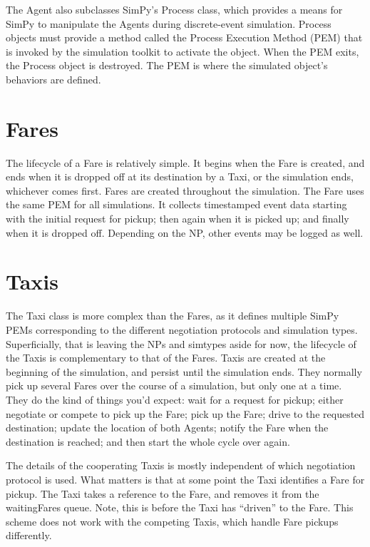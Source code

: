 \documentclass[11pt,letterpaper,onecolumn,twoside,openright,draft]{report}
\begin{document}
The Agent also subclasses SimPy's Process class, which provides a means for SimPy to manipulate the Agents during discrete-event simulation.
Process objects must provide a method called the Process Execution Method (PEM) that is invoked by the simulation toolkit to activate the object.
When the PEM exits, the Process object is destroyed.
The PEM is where the simulated object's behaviors are defined.

\section{Fares}
The lifecycle of a Fare is relatively simple.
It begins when the Fare is created, and ends when it is dropped off at its destination by a Taxi, or the simulation ends, whichever comes first.
Fares are created throughout the simulation.
The Fare uses the same PEM for all simulations.
It collects timestamped event data starting with the initial request for pickup; then again when it is picked up; and finally when it is dropped off.
Depending on the NP, other events may be logged as well.

\section{Taxis}
The Taxi class is more complex than the Fares, as it defines multiple SimPy PEMs corresponding to the different negotiation protocols and simulation types.
Superficially, that is leaving the NPs and simtypes aside for now, the lifecycle of the Taxis is complementary to that of the Fares.
Taxis are created at the beginning of the simulation, and persist until the simulation ends.
They normally pick up several Fares over the course of a simulation, but only one at a time.
They do the kind of things you'd expect: wait for a request for pickup; either negotiate or compete to pick up the Fare; pick up the Fare; drive to the requested destination; update the location of both Agents; notify the Fare when the destination is reached; and then start the whole cycle over again.

The details of the cooperating Taxis is mostly independent of which negotiation protocol is used.
What matters is that at some point the Taxi identifies a Fare for pickup.
The Taxi takes a reference to the Fare, and removes it from the waitingFares queue.
Note, this is before the Taxi has ``driven'' to the Fare.
This scheme does not work with the competing Taxis, which handle Fare pickups differently.
\end{document}
